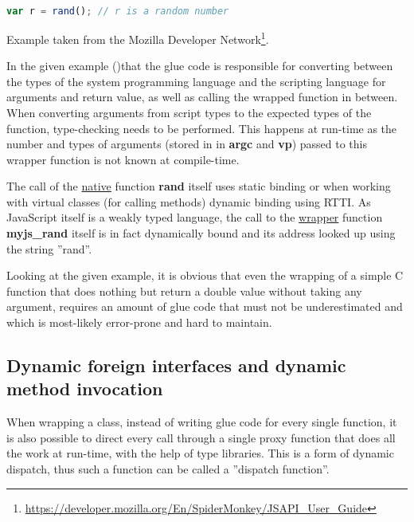 \begin{lstlisting}[language=JavaScript, caption=Using a C function from SpiderMonkey]
var r = rand();	// r is a random number
\end{lstlisting}

Example taken from the Mozilla Developer Network\footnote{\url{https://developer.mozilla.org/En/SpiderMonkey/JSAPI_User_Guide}}.

In the given example ()that the glue code is responsible for converting between the types of the system programming language and the scripting language for arguments and return value, as well as calling the wrapped function in between. When converting arguments from script types to the expected types of the function, type-checking needs to be performed. This happens at run-time as the number and types of arguments (stored in in \textbf{argc} and \textbf{vp}) passed to this wrapper function is not known at compile-time.

The call of the \underline{native} function \textbf{rand} itself uses static binding or when working with virtual classes (for calling methods) dynamic binding using RTTI. As JavaScript itself is a weakly typed language, the call to the \underline{wrapper} function \textbf{myjs\_rand} itself is in fact dynamically bound and its address looked up using the string ''rand''.

Looking at the given example, it is obvious that even the wrapping of a simple C function that does nothing but return a double value without taking any argument, requires an amount of glue code that must not be underestimated and which is most-likely error-prone and hard to maintain.


\subsection{Dynamic foreign interfaces and dynamic method invocation}
\label{sec:DynamicForeignInterfaces}

When wrapping a class, instead of writing glue code for every single function, it is also possible to direct every call through a single proxy function that does all the work at run-time, with the help of type libraries. This is a form of dynamic dispatch, thus such a function can be called a ''dispatch function''.

